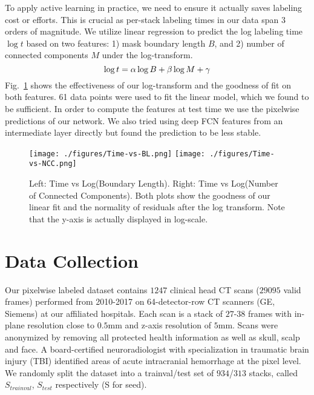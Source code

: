 \documentclass{llncs}
\begin{document}
To apply active learning in practice, we need to ensure it actually saves labeling cost or efforts. This is crucial as per-stack labeling times in our data span $3$ orders of magnitude. We utilize linear regression to predict the log labeling time $\log{t}$ based on two features: 1) mask boundary length $B$, and 2) number of connected components $M$ under the log-transform. 
\vspace*{-0.3cm}
\begin{equation}
    \log{t} = \alpha \log{B} + \beta \log{M} + \gamma
\vspace*{-0.15cm}
\end{equation}
Fig.~\ref{fig:pred_label_time} shows the effectiveness of our log-transform and the goodness of fit on both features. 61 data points were used to fit the linear model, which we found to be sufficient. In order to compute the features at test time we use the pixelwise predictions of our network. We also tried using deep FCN features from an intermediate layer directly but found the prediction to be less stable.

\begin{figure}[t]
    \centering
    \texttt{[image: ./figures/Time-vs-BL.png]}
    \texttt{[image: ./figures/Time-vs-NCC.png]}
    \caption{Left: Time vs Log(Boundary Length). Right: Time vs Log(Number of Connected Components). Both plots show the goodness of our linear fit and the normality of residuals after the log transform. Note that the y-axis is actually displayed in log-scale.}
    \label{fig:pred_label_time}
    \vspace*{-0.3cm}
\end{figure}


\vspace*{-0.1cm}
\section{Data Collection}
\vspace*{-0.2cm}
\label{sect:data}
Our pixelwise labeled dataset contains $1247$ clinical head CT scans ($29095$ valid frames) performed from 2010-2017 on 64-detector-row CT scanners (GE, Siemens) at our affiliated hospitals. %
Each scan is a stack of $27$-$38$ frames with in-plane resolution close to $0.5$mm and z-axis resolution of $5$mm. Scans were anonymized by removing all protected health information as well as skull, scalp and face.
A board-certified neuroradiologist with specialization in traumatic brain injury (TBI) identified areas of acute intracranial hemorrhage at the pixel level.
We randomly split the dataset into a trainval/test set of $934$/$313$ stacks, called $S_{trainval}$, $S_{test}$ respectively (S for seed).
\end{document}
